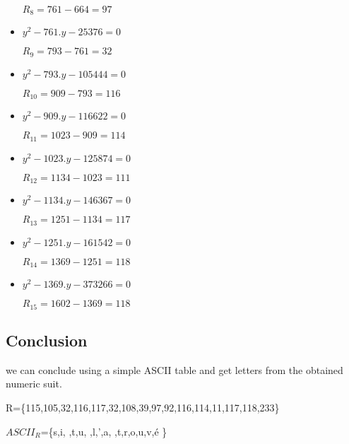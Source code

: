 \documentclass[letterpaper,10pt,english]{sphinxmanual}
\begin{document}
\begin{itemize}
\begin{flushleft}
  $R_{8}=761-664=97$
\end{flushleft}
\item \begin{flushleft}
  $ y^{2}-761.y-25376=0$
  
  $R_{9}=793-761=32$
\end{flushleft}
\item \begin{flushleft}
  $ y^{2}-793.y-105444=0$
  
  $R_{10}=909-793=116$
\end{flushleft}
\item \begin{flushleft}
  $ y^{2}-909.y-116622=0$
  
  $R_{11}=1023-909=114$
\end{flushleft}
\item \begin{flushleft}
  $ y^{2}-1023.y-125874=0$
  
  $R_{12}=1134-1023=111$
\end{flushleft}
\item \begin{flushleft}
  $ y^{2}-1134.y-146367=0$
  
  $R_{13}=1251-1134=117$
\end{flushleft}
\item \begin{flushleft}
  $ y^{2}-1251.y-161542=0$
  
  $R_{14}=1369-1251=118$
\end{flushleft}
\item \begin{flushleft}
  $ y^{2}-1369.y-373266=0$
  
  $R_{15}=1602-1369=118$
\end{flushleft}
\end{itemize}

\subsection{Conclusion}

\begin{flushleft}
  we can conclude using a simple ASCII table and get letters from the obtained numeric suit.

R=\{115,105,32,116,117,32,108,39,97,92,116,114,11,117,118,233\}

$ASCII_{R}$=\{s,i, ,t,u, ,l,',a, ,t,r,o,u,v,é \}
\end{flushleft}
\end{document}
